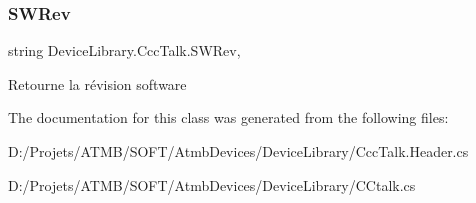 \subsubsection{\texorpdfstring{S\+W\+Rev}{SWRev}}
{\footnotesize\ttfamily string Device\+Library.\+Ccc\+Talk.\+S\+W\+Rev\hspace{0.3cm}{\ttfamily [get]}, {\ttfamily [protected]}}



Retourne la révision software 



The documentation for this class was generated from the following files\+:\begin{DoxyCompactItemize}
\item 
D\+:/\+Projets/\+A\+T\+M\+B/\+S\+O\+F\+T/\+Atmb\+Devices/\+Device\+Library/Ccc\+Talk.\+Header.\+cs\item 
D\+:/\+Projets/\+A\+T\+M\+B/\+S\+O\+F\+T/\+Atmb\+Devices/\+Device\+Library/C\+Ctalk.\+cs\end{DoxyCompactItemize}
